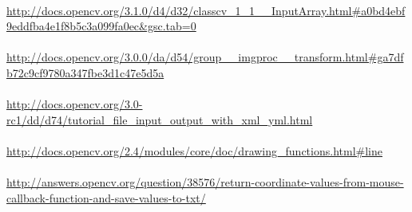 \documentclass{article}
\begin{document}
		\paragraph{} \url{http://docs.opencv.org/3.1.0/d4/d32/classcv_1_1__InputArray.html#a0bd4ebf9eddfba4e1f8b5c3a099fa0ec&gsc.tab=0}
		\paragraph{}
		\url{http://docs.opencv.org/3.0.0/da/d54/group__imgproc__transform.html#ga7dfb72c9cf9780a347fbe3d1c47e5d5a}
		\paragraph{}
		\url{http://docs.opencv.org/3.0-rc1/dd/d74/tutorial_file_input_output_with_xml_yml.html}
		\paragraph{}
		\url{http://docs.opencv.org/2.4/modules/core/doc/drawing_functions.html#line}
		\paragraph{}
		\url{http://answers.opencv.org/question/38576/return-coordinate-values-from-mouse-callback-function-and-save-values-to-txt/}
		
		  
\end{document}
